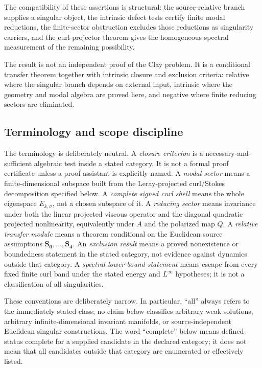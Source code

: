 \documentclass[aps,prd,reprint,superscriptaddress,nofootinbib,floatfix]{revtex4-2}
\theoremstyle{definition}
\theoremstyle{remark}
\begin{document}
The compatibility of these assertions is structural: the source-relative branch supplies a singular object, the intrinsic defect tests certify finite modal reductions, the finite-sector obstruction excludes those reductions as singularity carriers, and the curl-projector theorem gives the homogeneous spectral measurement of the remaining possibility.


The result is not an independent proof of the Clay problem.  It is a
conditional transfer theorem together with intrinsic closure and exclusion
criteria: relative where the singular branch depends on external input,
intrinsic where the geometry and modal algebra are proved here, and negative
where finite reducing sectors are eliminated.


\subsection{Terminology and scope discipline}\label{subsec:terminology}

The terminology is deliberately neutral.  A \emph{closure criterion} is a necessary-and-sufficient algebraic test inside a stated category.  It is not a formal proof certificate unless a proof assistant is explicitly named.  A \emph{modal sector} means a finite-dimensional subspace built from the Leray-projected curl/Stokes decomposition specified below.  A \emph{complete signed curl shell} means the whole eigenspace \(E_{k,\sigma}\), not a chosen subspace of it.  A \emph{reducing sector} means invariance under both the linear projected viscous operator and the diagonal quadratic projected nonlinearity, equivalently under \(A\) and the polarized map \(Q\).  A \emph{relative transfer module} means a theorem conditional on the Euclidean source assumptions \(\mathbf{S_0},\ldots,\mathbf{S_4}\).  An \emph{exclusion result} means a proved nonexistence or boundedness statement in the stated category, not evidence against dynamics outside that category.  A \emph{spectral lower-bound statement} means escape from every fixed finite curl band under the stated energy and \(L^\infty\) hypotheses; it is not a classification of all singularities.

These conventions are deliberately narrow.  In particular, ``all'' always refers to the immediately stated class; no claim below classifies arbitrary weak solutions, arbitrary infinite-dimensional invariant manifolds, or source-independent Euclidean singular constructions.  The word ``complete'' below means defined-status complete for a supplied candidate in the declared category; it does not mean that all candidates outside that category are enumerated or effectively listed.
\end{document}
